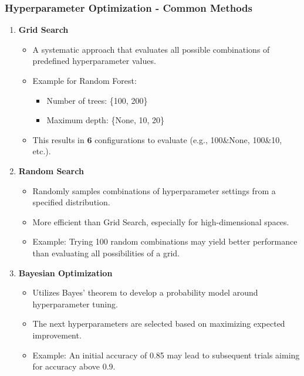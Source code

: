 \documentclass[aspectratio=169]{beamer}
\begin{document}
\begin{frame}[fragile]
    \frametitle{Hyperparameter Optimization - Common Methods}
    \begin{enumerate}
        \item \textbf{Grid Search}
            \begin{itemize}
                \item A systematic approach that evaluates all possible combinations of predefined hyperparameter values.
                \item Example for Random Forest:
                    \begin{itemize}
                        \item Number of trees: \{100, 200\}
                        \item Maximum depth: \{None, 10, 20\}
                    \end{itemize}
                \item This results in $\mathbf{6}$ configurations to evaluate (e.g., 100&None, 100&10, etc.).
            \end{itemize}

        \item \textbf{Random Search}
            \begin{itemize}
                \item Randomly samples combinations of hyperparameter settings from a specified distribution.
                \item More efficient than Grid Search, especially for high-dimensional spaces.
                \item Example: Trying 100 random combinations may yield better performance than evaluating all possibilities of a grid.
            \end{itemize}

        \item \textbf{Bayesian Optimization}
            \begin{itemize}
                \item Utilizes Bayes' theorem to develop a probability model around hyperparameter tuning.
                \item The next hyperparameters are selected based on maximizing expected improvement.
                \item Example: An initial accuracy of 0.85 may lead to subsequent trials aiming for accuracy above 0.9.
            \end{itemize}
    \end{enumerate}
\end{frame}
\end{document}
